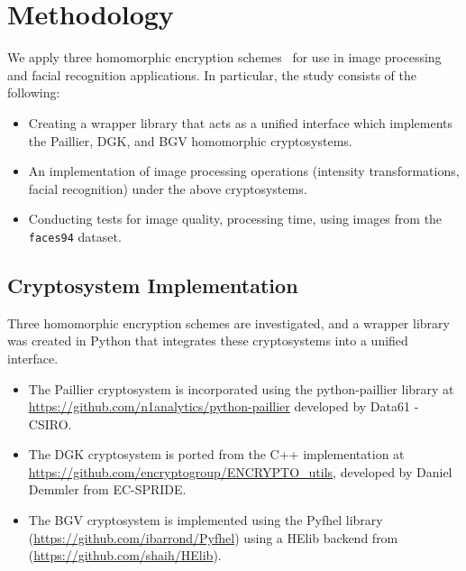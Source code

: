 \section{Methodology}
\label{sec:chapter_3}
We apply three homomorphic encryption schemes~\cite{ziad_cryptoimg:_2016, pieprzyk_efficient_2007, garay_algorithms_2014} for use in image processing and facial recognition applications. In particular, the study consists of the following:
\begin{itemize}
	\item Creating a wrapper library that acts as a unified interface which implements the Paillier, DGK, and BGV homomorphic cryptosystems.
	\item An implementation of image processing operations (intensity transformations, facial recognition) under the above cryptosystems.
	\item Conducting tests for image quality, processing time, using images from the \texttt{faces94} dataset.
\end{itemize}


\subsection{Cryptosystem Implementation}
Three homomorphic encryption schemes are investigated, and a wrapper library was created in Python that integrates these cryptosystems into a unified interface.
\begin{itemize}
	\item The Paillier cryptosystem is incorporated using the python-paillier library at \url{https://github.com/n1analytics/python-paillier} developed by Data61 - CSIRO.
	\item The DGK cryptosystem is ported from the C++ implementation at \url{https://github.com/encryptogroup/ENCRYPTO_utils}, developed by Daniel Demmler from EC-SPRIDE.
	\item The BGV cryptosystem is implemented using the Pyfhel library (\url{https://github.com/ibarrond/Pyfhel}) using a HElib backend from (\url{https://github.com/shaih/HElib}).
\end{itemize}

